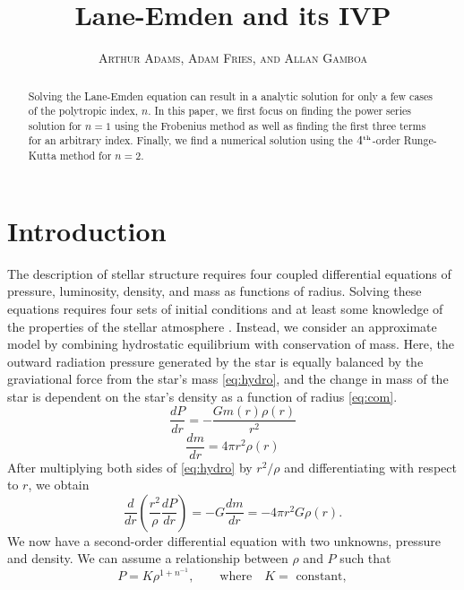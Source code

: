 \documentclass[12pt, manuscript]{article}
\title{Lane-Emden and its IVP}
\author{\small{\textsc{Arthur Adams, Adam Fries, and Allan Gamboa}}}
\affil{San Francisco State University \\ Department of Physics and Astronomy}
\begin{document}
\maketitle
    \begin{abstract}
        Solving the Lane-Emden equation can result in a analytic solution for only a few cases of the polytropic index, $n$. In this paper, we first focus on finding the power series solution for $n = 1$ using the Frobenius method as well as finding the first three terms for an arbitrary index. Finally, we find a numerical solution using the $4^{\text{\tiny{th}}}$-order Runge-Kutta method for $n = 2$.  
    \end{abstract}
    
    \section*{Introduction}
        The description of stellar structure requires four coupled differential equations of pressure, luminosity, density, and mass as functions of radius. Solving these equations requires four sets of initial conditions and at least some knowledge of the properties of the stellar atmosphere \cite{ac}. Instead, we consider an approximate model by combining hydrostatic equilibrium with conservation of mass. Here, the outward radiation pressure generated by the star is equally balanced by the graviational force from the star's mass \eqref{eq:hydro}, and the change in mass of the star is dependent on the star's density as a function of radius \eqref{eq:com}.
        \begin{equation}\label{eq:hydro}
            \frac{dP}{dr} = -\frac{Gm(r)\rho(r)}{r^2}
        \end{equation}   
        \begin{equation}\label{eq:com}
            \frac{dm}{dr} = 4\pi r^2\rho(r)
        \end{equation}
    After multiplying both sides of \eqref{eq:hydro} by $r^2/\rho$ and differentiating with respect to $r$, we obtain
        \begin{equation}\label{eq:hydro2}
            \frac{d}{dr}\left(\frac{r^2}{\rho}\frac{dP}{dr}\right) = -G\frac{dm}{dr} = -4\pi r^2G\rho(r).
        \end{equation}
        We now have a second-order differential equation with two unknowns, pressure and density. We can assume a relationship between $\rho$ and $P$ such that
        \begin{equation}\label{eq:poly}
            P = K\rho^{1 + n^{-1}}, \qquad \text{where} \quad K = \text{ constant},
        \end{equation}
\end{document}
